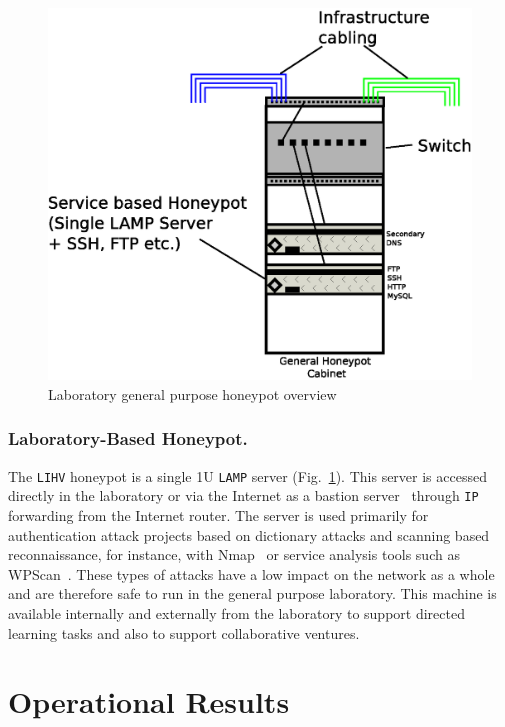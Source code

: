 \documentclass{llncs}
\begin{document}
\begin{figure}[h]
\begin{center}
	\includegraphics[scale=0.4]{Images/Infrastructure2.eps}
\caption{Laboratory general purpose honeypot overview}
\label{fig:Overview2}
\end{center}
\end{figure}

\subsubsection{Laboratory-Based Honeypot.}

The \texttt{LIHV} honeypot is a single 1U \texttt{LAMP} server
(Fig.~\ref{fig:Overview2}). This server is accessed directly in the
laboratory or via the Internet as a bastion server~\cite{MB:05} through
\texttt{IP} forwarding from the Internet router. The server is used primarily
for authentication attack projects based on dictionary attacks and scanning
based reconnaissance, for instance, with Nmap~\cite{GFL:09} or service analysis
tools such as WPScan~\cite{WT:17}. These types of attacks have a low impact on
the network as a whole and are therefore safe to run in the general purpose
laboratory. This machine is available internally and externally from the
laboratory to support directed learning tasks and also to support collaborative
ventures.

\section{Operational Results\label{Results}}
\end{document}
